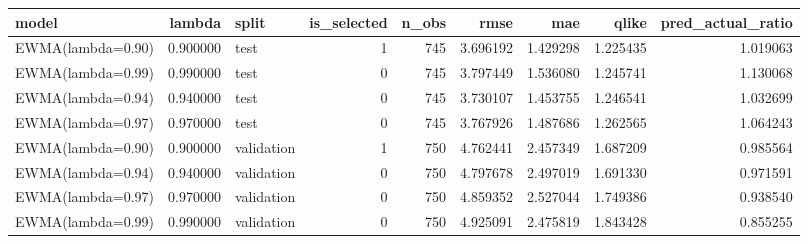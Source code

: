 \begin{tabular}{l r l r r r r r r}
\hline
model & lambda & split & is\_selected & n\_obs & rmse & mae & qlike & pred\_actual\_ratio \\
\hline
EWMA(lambda=0.90) & 0.900000 & test & 1 & 745 & 3.696192 & 1.429298 & 1.225435 & 1.019063 \\
EWMA(lambda=0.99) & 0.990000 & test & 0 & 745 & 3.797449 & 1.536080 & 1.245741 & 1.130068 \\
EWMA(lambda=0.94) & 0.940000 & test & 0 & 745 & 3.730107 & 1.453755 & 1.246541 & 1.032699 \\
EWMA(lambda=0.97) & 0.970000 & test & 0 & 745 & 3.767926 & 1.487686 & 1.262565 & 1.064243 \\
EWMA(lambda=0.90) & 0.900000 & validation & 1 & 750 & 4.762441 & 2.457349 & 1.687209 & 0.985564 \\
EWMA(lambda=0.94) & 0.940000 & validation & 0 & 750 & 4.797678 & 2.497019 & 1.691330 & 0.971591 \\
EWMA(lambda=0.97) & 0.970000 & validation & 0 & 750 & 4.859352 & 2.527044 & 1.749386 & 0.938540 \\
EWMA(lambda=0.99) & 0.990000 & validation & 0 & 750 & 4.925091 & 2.475819 & 1.843428 & 0.855255 \\
\hline
\end{tabular}
